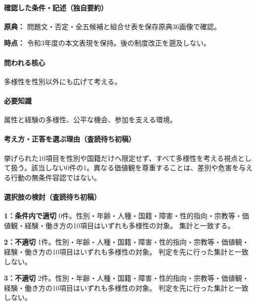 \paragraph{確認した条件・記述（独自要約）}\mbox{}\par

\noindent\textbf{原典：} 問題文・否定・全五候補と組合せ表を保存原典36画像で確認。\par

\noindent\textbf{時点：} 令和3年度の本文表現を保持。後の制度改正を遡及しない。\par

\paragraph{問われる核心} 多様性を性別以外にも広げて考える。

\paragraph{必要知識} 属性と経験の多様性、公平な機会、参加を支える環境。

\paragraph{考え方・正答を選ぶ理由（査読待ち初稿）} 挙げられた10項目を性別や国籍だけへ限定せず、すべて多様性を考える視点として扱う。該当しない0件の1。異なる価値観を尊重することは、差別や危害を与える行動の無条件容認ではない。

\paragraph{選択肢の検討（査読待ち初稿）}\mbox{}\par

\noindent\textbf{1：条件内で適切} 0件。性別・年齢・人種・国籍・障害・性的指向・宗教等・価値観・経験・働き方の10項目はいずれも多様性の対象。 集計と一致する。\par

\noindent\textbf{2：不適切} 1件。性別・年齢・人種・国籍・障害・性的指向・宗教等・価値観・経験・働き方の10項目はいずれも多様性の対象。 判定を先に行った集計と一致しない。\par

\noindent\textbf{3：不適切} 2件。性別・年齢・人種・国籍・障害・性的指向・宗教等・価値観・経験・働き方の10項目はいずれも多様性の対象。 判定を先に行った集計と一致しない。\par


